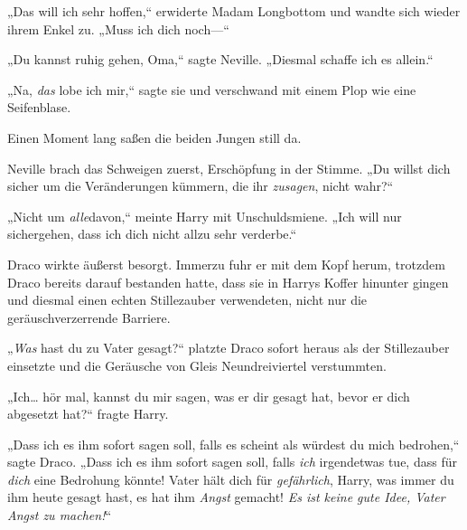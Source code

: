 „Das will ich sehr hoffen,“ erwiderte Madam Longbottom und wandte sich wieder ihrem Enkel zu. „Muss ich dich noch—“

„Du kannst ruhig gehen, Oma,“ sagte Neville. „Diesmal schaffe ich es allein.“

„Na, \emph{das} lobe ich mir,“ sagte sie und verschwand mit einem Plop wie eine Seifenblase.

Einen Moment lang saßen die beiden Jungen still da.

Neville brach das Schweigen zuerst, Erschöpfung in der Stimme. „Du willst dich sicher um die Veränderungen kümmern, die ihr \emph{zusagen}, nicht wahr?“

„Nicht um \emph{alle}davon,“ meinte Harry mit Unschuldsmiene. „Ich will nur sichergehen, dass ich dich nicht allzu sehr verderbe.“

\later

Draco wirkte äußerst besorgt. Immerzu fuhr er mit dem Kopf herum, trotzdem Draco bereits darauf bestanden hatte, dass sie in Harrys Koffer hinunter gingen und diesmal einen echten Stillezauber verwendeten, nicht nur die geräuschverzerrende Barriere.

„\emph{Was} hast du zu Vater gesagt?“ platzte Draco sofort heraus als der Stillezauber einsetzte und die Geräusche von Gleis Neundreiviertel verstummten.

„Ich… hör mal, kannst du mir sagen, was er dir gesagt hat, bevor er dich abgesetzt hat?“ fragte Harry.

„Dass ich es ihm sofort sagen soll, falls es scheint als würdest du mich bedrohen,“ sagte Draco. „Dass ich es ihm sofort sagen soll, falls \emph{ich} irgendetwas tue, dass für \emph{dich} eine Bedrohung könnte! Vater hält dich für \emph{gefährlich}, Harry, was immer du ihm heute gesagt hast, es hat ihm \emph{Angst} gemacht! \emph{Es ist keine gute Idee, Vater Angst zu machen!}“

